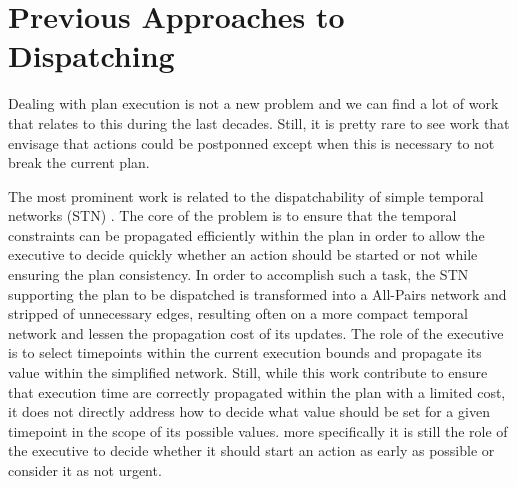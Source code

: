\section{Previous Approaches to Dispatching}


Dealing with plan execution is not a new problem and we can find a lot
of work that relates to this during the last decades. Still, it is
pretty rare to see work that envisage that actions could be
postponned except when this is necessary to not break the current
plan. 


The most prominent work is related to the dispatchability of simple 
temporal networks (STN) \cite{mus98}. The core of the problem is to
ensure that the temporal constraints can be propagated efficiently
within the plan in order to allow the executive to decide quickly
whether an action should  be started or not while ensuring the plan
consistency. In order to accomplish such a task, the STN supporting
the plan to be dispatched is transformed into a All-Pairs network and
stripped of unnecessary edges, resulting often on a more compact
temporal network and lessen the propagation cost of its updates. The
role of the executive is to select timepoints within the current
execution bounds and propagate its value within the simplified
network. Still, while this work contribute to ensure that execution
time are correctly propagated within the plan with a limited cost, it
does not directly address how to decide what value should be set for a
given timepoint in the scope of its possible values. more specifically
it is still the role of the executive to decide whether it should
start an action as early as possible or consider it as not urgent. 






